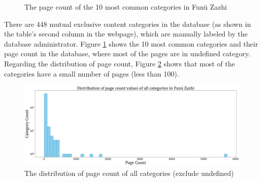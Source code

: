 \documentclass[12pt,twoside]{report}
\begin{document}
\begin{figure}[htbp]
    \caption{The page count of the 10 most common categories in Funü Zazhi}
    \label{fig:fnzz1}
\end{figure}

There are 448 mutual exclusive content categories in the database \cite{fnzzpages} (as shown in the table's second column in the webpage), which are manually labeled by the database administrator. Figure \ref{fig:fnzz1} shows the 10 most common categories and their page count in the database, where most of the pages are in undefined category. Regarding the distribution of page count, Figure \ref{fig:fnzz2} shows that most of the categories have a small number of pages (less than 100).

\begin{figure}[htbp]
    \centering
    \includegraphics[width=\textwidth]{./figures/fnzz2}
    \caption{The distribution of page count of all categories (exclude undefined)}
    \label{fig:fnzz2}
\end{figure}
\end{document}
